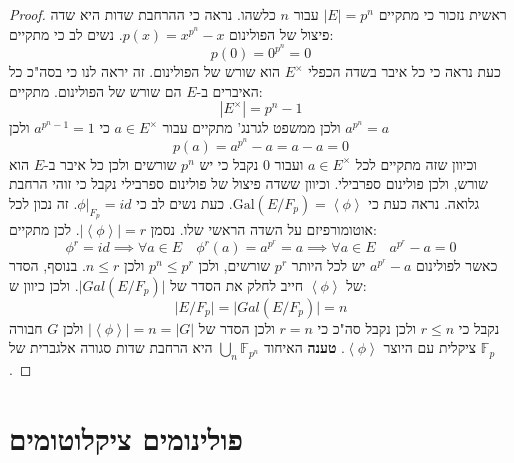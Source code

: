 \documentclass{tstextbook}
\begin{document}
\begin{proof}
ראשית נזכור כי מתקיים \(\lvert E \rvert=p^n\) עבור \(n\) כלשהו. נראה כי ההרחבת שדות היא שדה פיצול של הפולינום \(p(x)=x^{p^{n}}-x\). נשים לב כי מתקיים:
$$p(0)=0^{p^n}=0$$
כעת נראה כי כל איבר בשדה הכפלי \(E^{\times}\) הוא שורש של הפולינום. זה יראה לנו כי בסה"כ כל האיברים ב-\(E\) הם שורש של הפולינום. מתקיים:
$$\left\lvert  E^\times  \right\rvert =p^{n}-1$$
ולכן ממשפט לגרנג' מתקיים עבור \(a \in E^\times\) כי \(a^{p^{n}-1}=1\) ולכן \(a^{p^{n}}=a\)$$p(a)=a^{p^{n}}-a=a-a=0$$
וכיוון שזה מתקיים לכל \(a\in E^{\times}\) ועבור 0 נקבל כי יש \(p^{n}\) שורשים ולכן כל איבר ב-\(E\) הוא שורש, ולכן פולינום ספרבילי. וכיוון ששדה פיצול של פולינום ספרבילי נקבל כי זוהי הרחבת גלואה. 
נראה כעת כי \(\mathrm{Gal}(E / F_{p})=\left\langle  \phi  \right\rangle\). כעת נשים לב כי \(\phi|_{F_{p}}=id\). זה נכון לכל אוטומורפיזם על השדה הראשי שלו. נסמן \(\left\lvert  \left\langle  \phi  \right\rangle  \right\rvert=r\). לכן מתקיים:
$$\phi^r = id \implies \forall a \in E\quad \phi^{r}(a)=a^{p^{r}}=a\implies \forall a \in E\quad a^{p^{r}}-a=0$$
כאשר לפולינום \(a^{p^{r}}-a\) יש לכל היותר \(p^{r}\) שורשים, ולכן \(p^{n}\leq p^{r}\) ולכן \(n\leq r\). בנוסף, הסדר של \(\left\langle  \phi  \right\rangle\) חייב לחלק את הסדר של \(\lvert Gal(E / F_{p}) \rvert\). ולכן כיוון ש:
$$\lvert E / F_{p} \rvert=\lvert Gal(E / F_{p}) \rvert=n$$
נקבל כי \(r\leq n\) ולכן נקבל סה"כ כי \(r=n\) ולכן הסדר של \(\left\lvert  \left\langle  \phi  \right\rangle  \right\rvert=n=\lvert G \rvert\) ולכן \(G\) חבורה ציקלית עם היוצר \(\left\langle  \phi  \right\rangle\).
\textbf{טענה}
האיחוד \(\bigcup_{n}\mathbb{F}_{p^{n}}\) היא הרחבת שדות סגורה אלגברית של \(\mathbb{F} _p\).

\end{proof}
\section{פולינומים ציקלוטומים}
\end{document}

